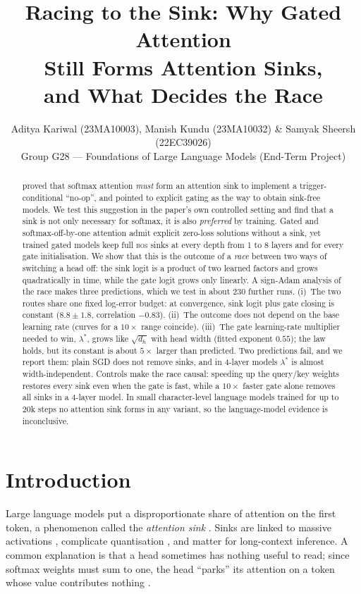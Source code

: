 \documentclass{article} %
\title{Racing to the Sink: Why Gated Attention \\ Still Forms Attention Sinks, \\ and What Decides the Race}
\author{Aditya Kariwal (23MA10003), Manish Kundu (23MA10032) \& Samyak Sheersh (22EC39026) \\
Group G28 --- Foundations of Large Language Models (End-Term Project)
}
\newcommand{\bos}{\textsc{bos}}
\begin{document}
\maketitle

\begin{abstract}
\citet{ranmilo2026sinks} proved that softmax attention \emph{must} form an attention sink to implement a
trigger-conditional ``no-op'', and pointed to explicit gating as the way to obtain sink-free models. We test
this suggestion in the paper's own controlled setting and find that a sink is not only necessary for softmax,
it is also \emph{preferred} by training. Gated and softmax-off-by-one attention admit explicit zero-loss
solutions without a sink, yet trained gated models keep full \bos{} sinks at every depth from 1 to 8 layers
and for every gate initialisation. We show that this is the outcome of a \emph{race} between two ways of
switching a head off: the sink logit is a product of two learned factors and grows quadratically in time,
while the gate logit grows only linearly. A sign-Adam analysis of the race makes three predictions, which we
test in about 230 further runs. (i)~The two routes share one fixed log-error budget: at convergence, sink logit plus gate
closing is constant ($8.8\pm1.8$, correlation $-0.83$). (ii)~The outcome does not depend on the base learning
rate (curves for a $10\times$ range coincide). (iii)~The gate learning-rate multiplier needed to win,
$\lambda^*$, grows like $\sqrt{d_h}$ with head width (fitted exponent $0.55$); the law holds, but its constant is
about $5\times$ larger than predicted. Two predictions fail, and we report them: plain SGD does not remove sinks, and in 4-layer models
$\lambda^*$ is almost width-independent. Controls make the race causal: speeding up the query/key weights
restores every sink even when the gate is fast, while a $10\times$ faster gate alone removes all sinks in a
4-layer model. In small character-level language models trained for up to 20k steps no attention sink forms
in any variant, so the language-model evidence is inconclusive.
\end{abstract}

\section{Introduction}
Large language models put a disproportionate share of attention on the first token, a phenomenon called
the \emph{attention sink} \citep{xiao2024streamingllm}. Sinks are linked to massive activations
\citep{sun2024massive}, complicate quantisation \citep{bondarenko2023quantizable}, and matter for
long-context inference. A common explanation is that a head sometimes has nothing useful to read; since
softmax weights must sum to one, the head ``parks'' its attention on a token whose value contributes
nothing \citep{miller2023off,gu2025when,guo2024active}.
\end{document}
